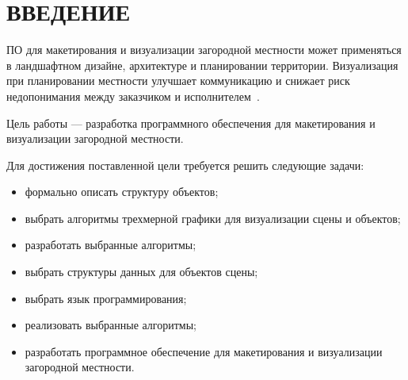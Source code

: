 \chapter*{ВВЕДЕНИЕ}

ПО для макетирования и визуализации загородной местности может применяться в ландшафтном дизайне, архитектуре и планировании территории.
Визуализация при планировании местности улучшает коммуникацию и снижает риск недопонимания между заказчиком и исполнителем~\cite{intro_visualization}.

Цель работы --- разработка программного обеспечения для макетирования и визуализации загородной местности.

Для достижения поставленной цели требуется решить следующие задачи:
\begin{itemize}
	\item формально описать структуру объектов;
	\item выбрать алгоритмы трехмерной графики для визуализации сцены и объектов;
	\item разработать выбранные алгоритмы;
	\item выбрать структуры данных для объектов сцены;
	\item выбрать язык программирования;
	\item реализовать выбранные алгоритмы;
	\item разработать программное обеспечение для макетирования и визуализации загородной местности.
\end{itemize}
